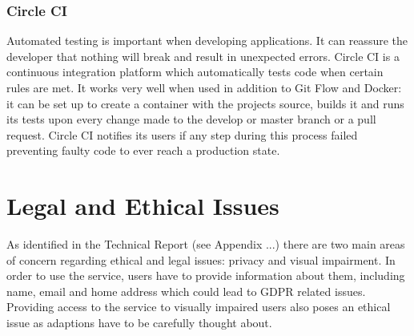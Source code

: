 \subsubsection{Circle CI}
Automated testing is important when developing applications. It can reassure the developer that nothing will break and result in unexpected errors. Circle CI is a continuous integration platform which automatically tests code when certain rules are met. It works very well when used in addition to Git Flow and Docker: it can be set up to create a container with the projects source, builds it and runs its tests upon every change made to the develop or master branch or a pull request. Circle CI notifies its users if any step during this process failed preventing faulty code to ever reach a production state.

\section{Legal and Ethical Issues}
As identified in the Technical Report (see Appendix ...) there are two main areas of concern regarding ethical and legal issues: privacy and visual impairment. In order to use the service, users have to provide information about them, including name, email and home address which could lead to GDPR related issues. Providing access to the service to visually impaired users also poses an ethical issue as adaptions have to be carefully thought about.